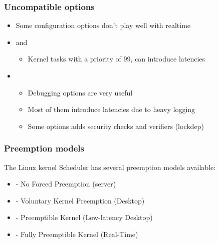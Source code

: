 \begin{frame}
  \frametitle{Uncompatible options}
        \begin{itemize}
                \item Some configuration options don't play well with realtime
                \item {} and 
                        \begin{itemize}
                                \item Kernel tasks with a priority of 99, can introduce latencies
                        \end{itemize}
                \item {}
                        \begin{itemize}
                                \item Debugging options are very useful
                                \item Most of them introduce latencies due to heavy logging
                                \item Some options adds security checks and verifiers (lockdep)
                        \end{itemize}
        \end{itemize}
\end{frame}

\begin{frame}
  \frametitle{Preemption models}
  The Linux kernel Scheduler has several preemption models available:
        \begin{itemize}
                \item {} - No Forced Preemption (server)
                \item {} - Voluntary Kernel Preemption (Desktop)
                \item {} - Preemptible Kernel (Low-latency Desktop)
                \item {} - Fully Preemptible Kernel (Real-Time)
        \end{itemize}
\end{frame}


